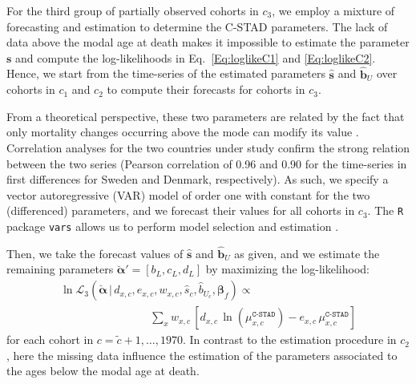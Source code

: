 \documentclass[11pt, a4paper]{article}
\begin{document}
For the third group of partially observed cohorts in $c_3$, we employ a mixture of forecasting and estimation to determine the C-STAD parameters. The lack of data above the modal age at death makes it impossible to estimate the parameter $\bm{s}$ and compute the log-likelihoods in Eq.~\eqref{Eq:loglikeC1} and \eqref{Eq:loglikeC2}. Hence, we start from the time-series of the estimated parameters $\hat{\bm{s}}$ and $\hat{\bm{b}}_U$ over cohorts in $c_1$ and $c_2$ to compute their forecasts for cohorts in $c_3$. 

From a theoretical perspective, these two parameters are related by the fact that only mortality changes occurring above the mode can modify its value \cite[cf.~Appendix B in][]{canudas2010three}. Correlation analyses for the two countries under study confirm the strong relation between the two series (Pearson correlation of 0.96 and 0.90 for the time-series in first differences for Sweden and Denmark, respectively). As such, we specify a vector autoregressive (VAR) model of order one with constant for the two (differenced) parameters, and we forecast their values for all cohorts in $c_3$. The \texttt{R} package \texttt{vars} allows us to perform model selection and estimation \citep{pfaff2008analysis,pfaff2008var}.

Then, we take the forecast values of $\hat{\bm{s}}$ and $\hat{\bm{b}}_U$ as given, and we estimate the remaining parameters $\breve{\bm{\alpha}}'=\left[b_{L},c_{L},d_{L}\right]$ by maximizing the log-likelihood:
%
\begin{equation}\label{Eq:loglikeC3}
\begin{aligned}
\ln\mathcal{L}_3\left(\breve{\bm{\alpha}}\,|\,d_{x,c} , e_{x,c} , w_{x,c} , \hat{s}_{c}, \hat{b}_{U_{c}} , \bm{\beta}_{f} \right) \propto \qquad\qquad\qquad\qquad \\ \qquad\qquad\qquad\qquad \sum_{x} w_{x,c} \, \left[  d_{x,c} \,
\ln \left( \mu^{\texttt{C-STAD}}_{x,c}  \right) - e_{x,c}
\, \mu^{\texttt{C-STAD}}_{x,c} \right] 
\end{aligned}
\end{equation}
%
for each cohort in $c=\tilde{c}+1,\ldots,1970$. In contrast to the estimation procedure in $c_2$, here the missing data influence the estimation of the parameters associated to the ages below the modal age at death. \par
\end{document}
